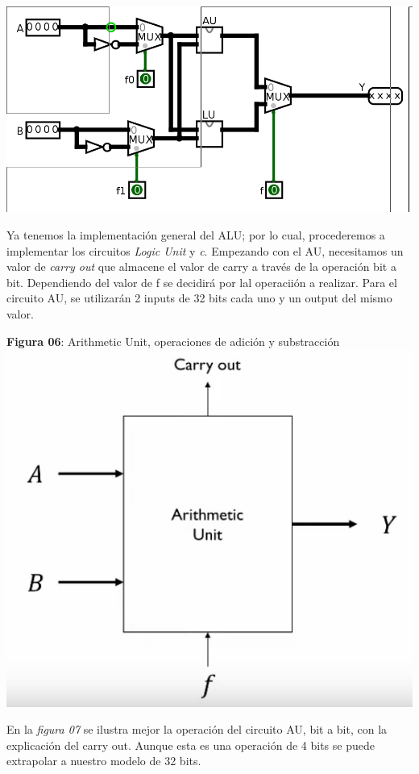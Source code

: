 \documentclass[11pt]{article}
\begin{document}
\begin{question}
{\begin{center}
		\includegraphics[scale=0.4]{IMAGES_07}
	\end{center}
	Ya tenemos la implementación general del ALU; por lo cual, procederemos a implementar los circuitos \textit{Logic Unit} y \textit{c}. Empezando con el AU, necesitamos un valor de \textit{carry out} que almacene el valor de carry a través de la operación bit a bit. Dependiendo del valor de f se decidirá por lal operaciión a realizar. Para el circuito AU, se utilizarán 2 inputs de 32 bits cada uno y un output del mismo valor.
	\begin{center} \textbf{Figura 06}: Arithmetic Unit, operaciones de adición y substracción 
		\includegraphics[scale=0.25]{IMAGES_05}
	\end{center}
	En la \emph{figura 07} se ilustra mejor la operación del circuito AU, bit a bit, con la explicación del carry out. Aunque esta es una operación de 4 bits se puede extrapolar a nuestro modelo de 32 bits.
}
\end{question}
\end{document}
